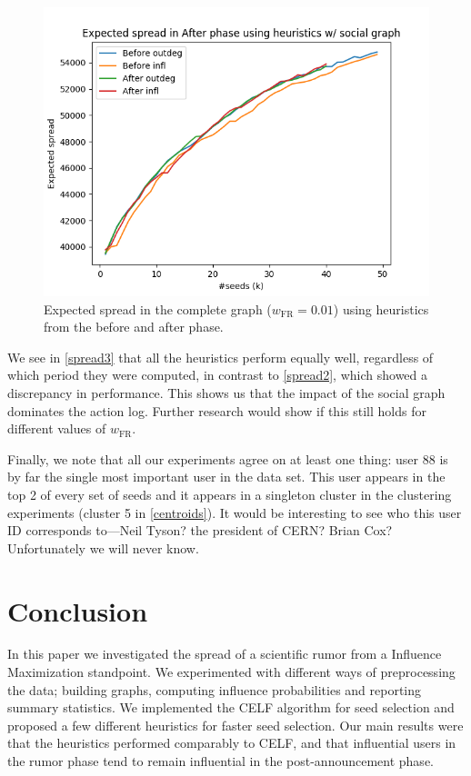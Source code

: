 \documentclass[sigconf]{acmart}
\begin{document}
\begin{figure}[htbp]
\begin{center}
\includegraphics[width=0.9\linewidth]{Figures/p1_p2_heuristic.png}
\caption{Expected spread in the complete graph ($w_{\text{FR}} = 0.01$) using heuristics from the before and after phase.}
\label{spread3}
\end{center}
\end{figure}

We see in \autoref{spread3} that all the heuristics perform equally well, regardless of which period they were computed, in contrast to \autoref{spread2}, which showed a discrepancy in performance. This shows us that the impact of the social graph dominates the action log. Further research would show if this still holds for different values of $w_{\text{FR}}$.

Finally, we note that all our experiments agree on at least one thing: user 88 is by far the single most important user in the data set. This user appears in the top 2 of every set of seeds and it appears in a singleton cluster in the clustering experiments (cluster 5 in \autoref{centroids}). It would be interesting to see who this user ID corresponds to---Neil Tyson? the president of CERN? Brian Cox? Unfortunately we will never know.

\section{Conclusion}

In this paper we investigated the spread of a scientific rumor from a Influence Maximization standpoint. We experimented with different ways of preprocessing the data; building graphs, computing influence probabilities and reporting summary statistics. We implemented the CELF algorithm for seed selection and proposed a few different heuristics for faster seed selection. Our main results were that the heuristics performed comparably to CELF, and that influential users in the rumor phase tend to remain influential in the post-announcement phase. 
\end{document}
